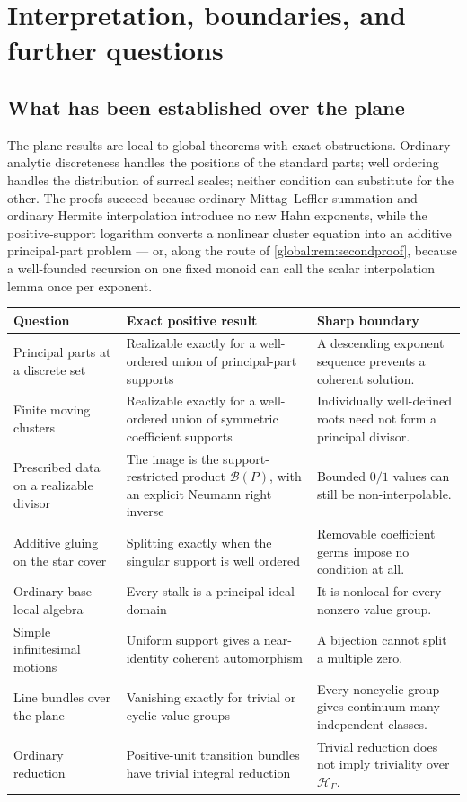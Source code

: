 \documentclass[11pt,letterpaper]{article}
\theoremstyle{definition}
\theoremstyle{remark}
\newcommand{\HH}{\mathscr H_\Gamma}
\newcommand{\BB}{\mathscr B(P)}
\numberwithin{equation}{section}
\begin{document}
\section{Interpretation, boundaries, and further questions}\label{global:sec:scope}

\subsection{What has been established over the plane}

The plane results are local-to-global theorems with exact obstructions. Ordinary analytic discreteness handles the positions of the standard parts; well ordering handles the distribution of surreal scales; neither condition can substitute for the other. The proofs succeed because ordinary Mittag--Leffler summation and ordinary Hermite interpolation introduce no new Hahn exponents, while the positive-support logarithm converts a nonlinear cluster equation into an additive principal-part problem --- or, along the route of \cref{global:rem:secondproof}, because a well-founded recursion on one fixed monoid can call the scalar interpolation lemma once per exponent.

\begin{center}\small
\begin{tabular}{@{}L{0.26\textwidth}L{0.32\textwidth}L{0.32\textwidth}@{}}
\toprule
Question & Exact positive result & Sharp boundary\\
\midrule
Principal parts at a discrete set & Realizable exactly for a well-ordered union of principal-part supports & A descending exponent sequence prevents a coherent solution.\\[0.45em]
Finite moving clusters & Realizable exactly for a well-ordered union of symmetric coefficient supports & Individually well-defined roots need not form a principal divisor.\\[0.45em]
Prescribed data on a realizable divisor & The image is the support-restricted product $\BB$, with an explicit Neumann right inverse & Bounded $0/1$ values can still be non-interpolable.\\[0.45em]
Additive gluing on the star cover & Splitting exactly when the singular support is well ordered & Removable coefficient germs impose no condition at all.\\[0.45em]
Ordinary-base local algebra & Every stalk is a principal ideal domain & It is nonlocal for every nonzero value group.\\[0.45em]
Simple infinitesimal motions & Uniform support gives a near-identity coherent automorphism & A bijection cannot split a multiple zero.\\[0.45em]
Line bundles over the plane & Vanishing exactly for trivial or cyclic value groups & Every noncyclic group gives continuum many independent classes.\\[0.45em]
Ordinary reduction & Positive-unit transition bundles have trivial integral reduction & Trivial reduction does not imply triviality over $\HH$.\\
\bottomrule
\end{tabular}
\end{center}
\end{document}
